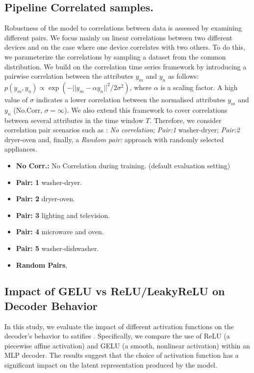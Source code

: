 \documentclass{article} %
\theoremstyle{plain}
\theoremstyle{definition}
\theoremstyle{remark}
\numberwithin{equation}{section}
\begin{document}
\subsection{Pipeline Correlated samples.}\label{appendix:pipeline_correlated_sampling} Robustness of the model to correlations between data is assessed by examining different pairs. We focus mainly on linear correlations between two different devices and on the case where one device correlates with two others. To do this, we parameterize the correlations by sampling a dataset from the common distribution. We build on the correlation time series framework by introducing a pairwise correlation between the attributes $y_{m}$ and $y_{n}$ as follows: $p(y_{m}, y_{n}) \propto \exp\left(-||y_{m} - \alpha y_{n}||^2/2\sigma^2\right)$, where $\alpha$ is a scaling factor. A high value of $\sigma$ indicates a lower correlation between the normalised attributes $y_{m}$ and $y_{n}$ (No.Corr, $\sigma=\infty$). We also extend this framework to cover correlations between several attributes in the time window $T$. Therefore, we consider correlation pair scenarios such as : \textit{No correlation}; \textit{Pair:1 } washer-dryer; \textit{Pair:2 } dryer-oven and, finally, a \textit{Random pair:} approach with randomly selected appliances.
\begin{itemize}
  \item \textbf{No Corr.:} No Correlation during training. (default evaluation setting) 
  \item \textbf{Pair: 1} washer-dryer.
  \item \textbf{Pair: 2} dryer-oven.
  \item \textbf{Pair: 3} lighting and television.
  \item \textbf{Pair: 4} microwave and oven.
  \item \textbf{Pair: 5} washer-dishwasher.
  \item \textbf{Random Pairs},  
\end{itemize}




\subsection{Impact of GELU vs ReLU/LeakyReLU on Decoder Behavior}

In this study, we evaluate the impact of different activation functions on the decoder's behavior to satifies . Specifically, we compare the use of ReLU (a piecewise affine activation) and GELU (a smooth, nonlinear activation) within an MLP decoder. The results suggest that the choice of activation function has a significant impact on the latent representation produced by the model.
\end{document}
